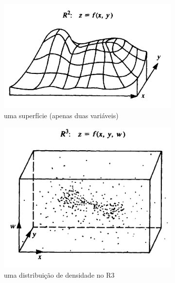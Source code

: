 \noindent
\begin{figure}[!ht]
\caption{As funções de duas ou três variáveis podem ser representadas graficamente de várias maneiras como:}
\begin{subfigure}[t]{0.33\linewidth}\centering
\includegraphics[scale=0.3]{figs/leah/fig09.01a.png}
\caption{\small uma superfície (apenas duas variáveis)}
\label{fig:09.01a}
\end{subfigure}
\begin{subfigure}[t]{0.33\linewidth}\centering
\includegraphics[scale=0.3]{figs/leah/fig09.01b.png}
\caption{\small uma distribuição de densidade no R3}
\label{fig:09.01b}
\end{subfigure}
\begin{subfigure}[t]{0.32\linewidth}\centering

\end{subfigure}
\end{figure}

